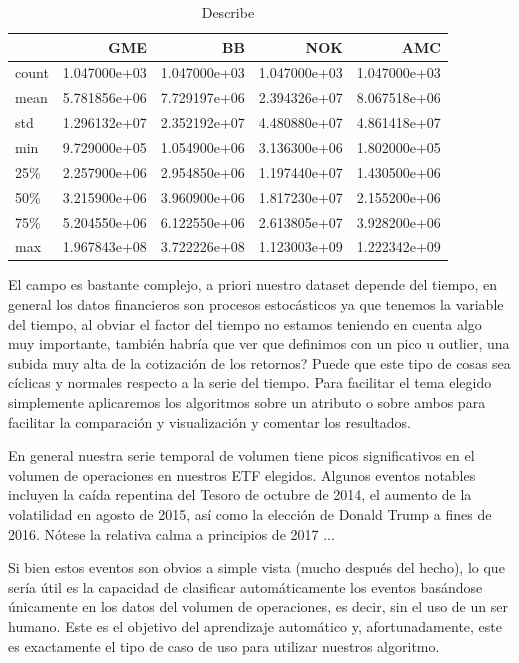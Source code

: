 \documentclass[12pt,twoside]{report}
\begin{document}
\begin{table}[H]
\centering
\begin{tabular}{lrrrr}
\toprule
{} &           GME &            BB &           NOK &           AMC \\
\midrule
count &  1.047000e+03 &  1.047000e+03 &  1.047000e+03 &  1.047000e+03 \\
mean  &  5.781856e+06 &  7.729197e+06 &  2.394326e+07 &  8.067518e+06 \\
std   &  1.296132e+07 &  2.352192e+07 &  4.480880e+07 &  4.861418e+07 \\
min   &  9.729000e+05 &  1.054900e+06 &  3.136300e+06 &  1.802000e+05 \\
25\%   &  2.257900e+06 &  2.954850e+06 &  1.197440e+07 &  1.430500e+06 \\
50\%   &  3.215900e+06 &  3.960900e+06 &  1.817230e+07 &  2.155200e+06 \\
75\%   &  5.204550e+06 &  6.122550e+06 &  2.613805e+07 &  3.928200e+06 \\
max   &  1.967843e+08 &  3.722226e+08 &  1.123003e+09 &  1.222342e+09 \\
\bottomrule
\end{tabular}
\caption{Describe}
\label{tab:describe}
\end{table}

El campo es bastante complejo, a priori nuestro dataset depende del tiempo, en general los datos financieros son procesos estocásticos ya que tenemos la variable del tiempo, al obviar el factor del tiempo no estamos teniendo en cuenta algo muy importante, también habría que ver que definimos con un pico u outlier, una subida muy alta de la cotización de los retornos? Puede que este tipo de cosas sea cíclicas y normales respecto a la serie del tiempo. Para facilitar el tema elegido simplemente aplicaremos los algoritmos sobre un atributo o sobre ambos para facilitar la comparación y visualización y comentar los resultados. 

En general nuestra serie temporal de volumen tiene picos significativos en el volumen de operaciones en nuestros ETF elegidos. Algunos eventos notables incluyen la caída repentina del Tesoro de octubre de 2014, el aumento de la volatilidad en agosto de 2015, así como la elección de Donald Trump a fines de 2016. Nótese la relativa calma a principios de 2017 ...

Si bien estos eventos son obvios a simple vista (mucho después del hecho), lo que sería útil es la capacidad de clasificar automáticamente los eventos basándose únicamente en los datos del volumen de operaciones, es decir, sin el uso de un ser humano. Este es el objetivo del aprendizaje automático y, afortunadamente, este es exactamente el tipo de caso de uso para utilizar nuestros algoritmo.
\end{document}
